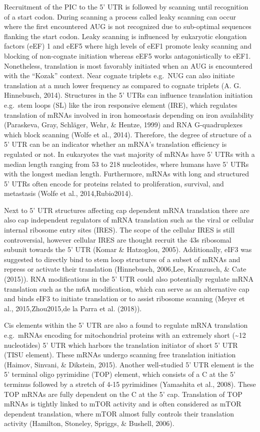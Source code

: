 \documentclass[12pt,openany]{book}
\begin{document}
Recruitment of the PIC to the 5' UTR is followed by scanning until
recognition of a start codon. During scanning a process called leaky
scanning can occur where the first encountered AUG is not recognized due
to sub-optimal sequences flanking the start codon. Leaky scanning is
influenced by eukaryotic elongation factors (eEF) 1 and eEF5 where high
levels of eEF1 promote leaky scanning and blocking of non-cognate
initiation whereas eEF5 works antagonistically to eEF1. Nonetheless,
translation is most favorably initiated when an AUG is encountered with
the ``Kozak'' context. Near cognate triplets e.g.~NUG can also initiate
translation at a much lower frequency as compared to cognate triplets
(A. G. Hinnebusch, 2014). Structures in the 5' UTRs can influence
translation initiation e.g.~stem loops (SL) like the iron responsive
element (IRE), which regulates translation of mRNAs involved in iron
homeostasis depending on iron availability (Paraskeva, Gray, Schläger,
Wehr, \& Hentze, 1999) and RNA G-quadruplexes which block scanning
(Wolfe et al., 2014). Therefore, the degree of structure of a 5' UTR can
be an indicator whether an mRNA's translation efficiency is regulated or
not. In eukaryotes the vast majority of mRNAs have 5' UTRs with a median
length ranging from 53 to 218 nucleotides, where humans have 5' UTRs
with the longest median length. Furthermore, mRNAs with long and
structured 5' UTRs often encode for proteins related to proliferation,
survival, and metastasis (Wolfe et al., 2014,Rubio2014).

Next to 5' UTR structures affecting cap dependent mRNA translation there
are also cap independent regulators of mRNA translation such as the
viral or cellular internal ribosome entry sites (IRES). The scope of the
cellular IRES is still controversial, however cellular IRES are thought
recruit the 43s ribosomal subunit towards the 5' UTR (Komar \&
Hatzoglou, 2005). Additionally, eIF3 was suggested to directly bind to
stem loop structures of a subset of mRNAs and repress or activate their
translation (Hinnebusch, 2006,Lee, Kranzusch, \& Cate (2015)). RNA
modifications in the 5' UTR could also potentially regulate mRNA
translation such as the m6A modification, which can serve as an
alternative cap and binds eIF3 to initiate translation or to assist
ribosome scanning (Meyer et al., 2015,Zhou2015,de la Parra et al.
(2018)).

Cis elements within the 5' UTR are also a found to regulate mRNA
translation e.g.~mRNAs encoding for mitochondrial proteins with an
extremely short (\textasciitilde{}12 nucleotides) 5' UTR which harbors
the translation initiator of short 5' UTR (TISU element). These mRNAs
undergo scanning free translation initiation (Haimov, Sinvani, \&
Dikstein, 2015). Another well-studied 5' UTR element is the 5' terminal
oligo pyrimidine (TOP) element, which consists of a C at the 5' terminus
followed by a stretch of 4-15 pyrimidines (Yamashita et al., 2008).
These TOP mRNAs are fully dependent on the C at the 5' cap. Translation
of TOP mRNAs is tightly linked to mTOR activity and is often considered
as mTOR dependent translation, where mTOR almost fully controls their
translation activity (Hamilton, Stoneley, Spriggs, \& Bushell, 2006).
\end{document}
